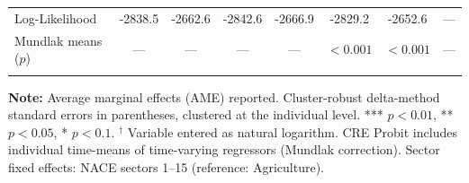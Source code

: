 \begin{landscape}
\begin{table}[htbp]
\begin{tabular*}{\linewidth}{ @{\extracolsep{\fill}} @{}lccccccc@{} @{} }
  Log-Likelihood & -2838.5 & -2662.6 & -2842.6 & -2666.9 & -2829.2 & -2652.6 & --- \\
  Mundlak means ($p$) & --- & --- & --- & --- & $< 0.001$ & $< 0.001$ & --- \\
  \bottomrule
  \vspace{1.5pt}
\end{tabular*}
\smallskip
\begin{minipage}{\linewidth}
\footnotesize
\textbf{Note:} Average marginal effects (AME) reported. Cluster-robust delta-method standard errors in parentheses, clustered at the individual level. *** $p<0.01$, ** $p<0.05$, * $p<0.1$. $^\dagger$ Variable entered as natural logarithm. CRE Probit includes individual time-means of time-varying regressors (Mundlak correction). Sector fixed effects: NACE sectors 1--15 (reference: Agriculture).
\end{minipage}
\end{table}
\end{landscape}
